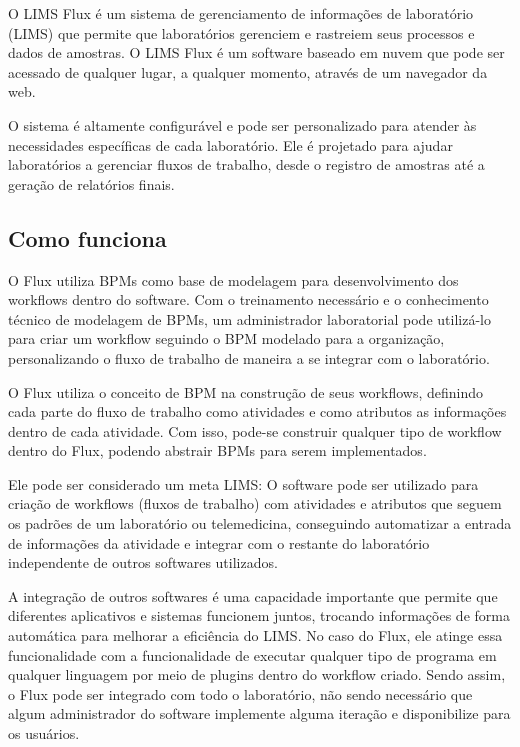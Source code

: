 
O LIMS Flux é um sistema de gerenciamento de informações de laboratório (LIMS) que permite que laboratórios gerenciem e rastreiem seus processos e dados de amostras. O LIMS Flux é um software baseado em nuvem que pode ser acessado de qualquer lugar, a qualquer momento, através de um navegador da web.

O sistema é altamente configurável e pode ser personalizado para atender às necessidades específicas de cada laboratório. Ele é projetado para ajudar laboratórios a gerenciar fluxos de trabalho, desde o registro de amostras até a geração de relatórios finais.

\subsection{Como funciona}

O Flux utiliza BPMs como base de modelagem para desenvolvimento dos workflows dentro do software. Com o treinamento necessário e o conhecimento técnico de modelagem de BPMs, um administrador laboratorial pode utilizá-lo para criar um workflow seguindo o BPM modelado para a organização, personalizando o fluxo de trabalho de maneira a se integrar com o laboratório.

O Flux utiliza o conceito de BPM na construção de seus workflows, definindo cada parte do fluxo de trabalho como atividades e como atributos as informações dentro de cada atividade. Com isso, pode-se construir qualquer tipo de workflow dentro do Flux, podendo abstrair BPMs para serem implementados.

Ele pode ser considerado um meta LIMS: O software pode ser utilizado para criação de workflows (fluxos de trabalho) com atividades e atributos que seguem os padrões de um laboratório ou telemedicina, conseguindo automatizar a entrada de informações da atividade e integrar com o restante do laboratório independente de outros softwares utilizados.

A integração de outros softwares é uma capacidade importante que permite que diferentes aplicativos e sistemas funcionem juntos, trocando informações de forma automática para melhorar a eficiência do LIMS. No caso do Flux, ele atinge essa funcionalidade com a funcionalidade de executar qualquer tipo de programa em qualquer linguagem por meio de plugins dentro do workflow criado.
Sendo assim, o Flux pode ser integrado com todo o laboratório, não sendo necessário que algum administrador do software implemente alguma iteração e disponibilize para os usuários.

